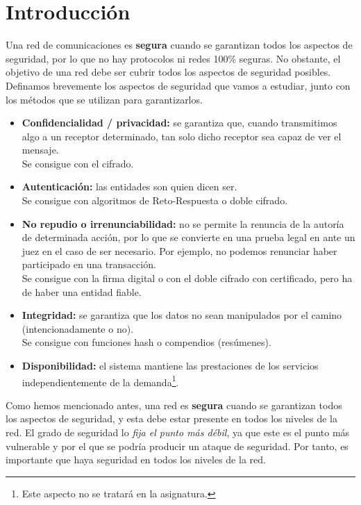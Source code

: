 \section{Introducción}
Una red de comunicaciones es \textbf{segura} cuando se garantizan todos los aspectos de seguridad, por lo que no hay protocolos ni redes 100\% seguras. No obstante, el objetivo de una red debe ser cubrir todos los aspectos de seguridad posibles.
Definamos brevemente los aspectos de seguridad que vamos a estudiar, junto con los métodos que se utilizan para garantizarlos.
\begin{itemize}
    \item \textbf{Confidencialidad / privacidad:} se garantiza que, cuando transmitimos algo a un receptor determinado, tan solo dicho receptor sea capaz de ver el mensaje.\\
    Se consigue con el cifrado. 
    \item \textbf{Autenticación:} las entidades son quien dicen ser.\\
    Se consigue con algoritmos de Reto-Respuesta o doble cifrado. 
    \item \textbf{No repudio o irrenunciabilidad:} 
    no se permite la renuncia de la autoría de determinada acción, por lo que se convierte en una prueba legal en ante un juez en el caso de ser necesario. Por ejemplo, no podemos renunciar haber participado en una transacción.\\
    Se consigue con la firma digital o con el doble cifrado con certificado, pero ha de haber una entidad fiable. 
    \item \textbf{Integridad:} se garantiza que los datos no sean manipulados por el camino (intencionadamente o no).\\
    Se consigue con funciones hash o compendios (resúmenes).
    \item \textbf{Disponibilidad:} el sistema mantiene las prestaciones de los servicios independientemente de la demanda\footnote{Este aspecto no se tratará en la asignatura.}.
\end{itemize}

Como hemos mencionado antes, una red es \textbf{segura} cuando se garantizan todos los aspectos de seguridad, y esta debe estar presente en todos los niveles de la red. El grado de seguridad lo \emph{fija el punto más débil}, ya que este es el punto más vulnerable y por el que se podría producir un ataque de seguridad. Por tanto, es importante que haya seguridad en todos los niveles de la red.


